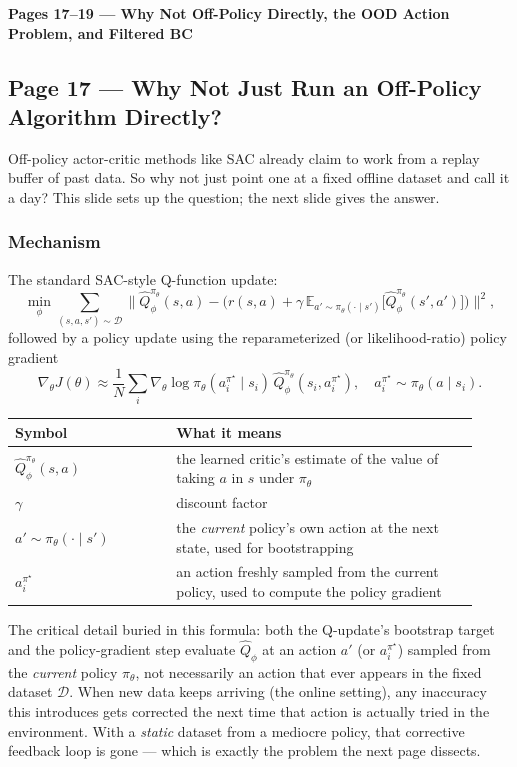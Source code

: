 \bigskip

\textbf{Pages 17--19 --- Why Not Off-Policy Directly, the OOD Action Problem, and Filtered BC}

\subsection*{Page 17 --- Why Not Just Run an Off-Policy Algorithm Directly?}

Off-policy actor-critic methods like SAC already claim to work from a replay buffer of past data. So why not just point one at a fixed offline dataset and call it a day? This slide sets up the question; the next slide gives the answer.

\subsubsection*{Mechanism}

The standard SAC-style Q-function update:
\[
\min_\phi \sum_{(s,a,s')\sim\mathcal{D}} \Big\lVert \hat Q^{\pi_\theta}_\phi(s,a) - \big(r(s,a) + \gamma\,\mathbb{E}_{a'\sim\pi_\theta(\cdot\mid s')}\big[\hat Q^{\pi_\theta}_\phi(s',a')\big]\big)\Big\rVert^2,
\]
followed by a policy update using the reparameterized (or likelihood-ratio) policy gradient
\[
\nabla_\theta J(\theta) \approx \frac{1}{N}\sum_i \nabla_\theta \log \pi_\theta(a_i^{\pi^\star}\mid s_i)\, \hat Q^{\pi_\theta}_\phi(s_i, a_i^{\pi^\star}), \quad a_i^{\pi^\star}\sim\pi_\theta(a\mid s_i).
\]

\begin{center}
\begin{tabular}{@{}p{0.32\linewidth}p{0.6\linewidth}@{}}
\toprule
Symbol & What it means \\
\midrule
$\hat Q^{\pi_\theta}_\phi(s,a)$ & the learned critic's estimate of the value of taking $a$ in $s$ under $\pi_\theta$ \\
$\gamma$ & discount factor \\
$a' \sim \pi_\theta(\cdot\mid s')$ & the \emph{current} policy's own action at the next state, used for bootstrapping \\
$a_i^{\pi^\star}$ & an action freshly sampled from the current policy, used to compute the policy gradient \\
\bottomrule
\end{tabular}
\end{center}

The critical detail buried in this formula: both the Q-update's bootstrap target and the policy-gradient step evaluate $\hat Q_\phi$ at an action $a'$ (or $a_i^{\pi^\star}$) sampled from the \emph{current} policy $\pi_\theta$, not necessarily an action that ever appears in the fixed dataset $\mathcal{D}$. When new data keeps arriving (the online setting), any inaccuracy this introduces gets corrected the next time that action is actually tried in the environment. With a \emph{static} dataset from a mediocre policy, that corrective feedback loop is gone --- which is exactly the problem the next page dissects.

